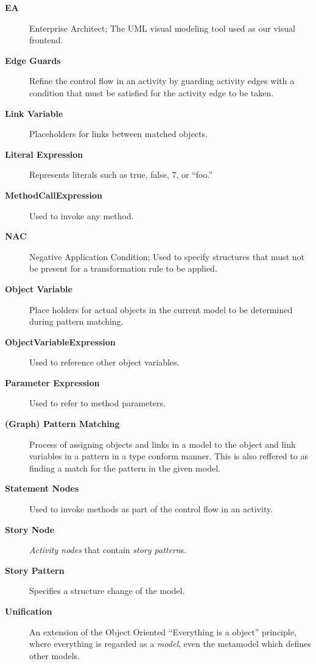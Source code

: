 \begin{description}
\item[\bf EA]
Enterprise Architect; The UML visual modeling tool used as our visual frontend.

\item[\bf Edge Guards]
Refine the control flow in an activity by guarding activity edges with a condition that must be satisfied for the activity edge to be taken.

\item[\bf Link Variable]
Placeholders for links between matched objects.

\item[\bf Literal Expression]
Represents literals such as true, false, 7, or ``foo.''

\item[\bf MethodCallExpression]
Used to invoke any method.

\item[\bf NAC]
Negative Application Condition; Used to specify structures that must not be present for a transformation rule to be applied.
	
\item[\bf Object Variable]
Place holders for actual objects in the current model to be determined during pattern matching.

\item[\bf ObjectVariableExpression]
Used to reference other object variables.

\item[\bf Parameter Expression]
Used to refer to method parameters.

\item[\bf (Graph) Pattern Matching]
Process of assigning objects and links in a model to the object and link variables in a pattern in a type conform manner. This is also reffered to as finding a
match for the pattern in the given model.

\item[\bf Statement Nodes]
Used to invoke methods as part of the control flow in an activity.

\item[\bf Story Node]
\emph{Activity nodes} that contain \emph{story pattern}s.

\item[\bf Story Pattern]
Specifies a structure change of the model.

\item[\bf Unification]
An extension of the Object Oriented ``Everything is a object'' principle, where everything is regarded as a \emph{model}, even the metamodel which defines
other models.

\end{description}
